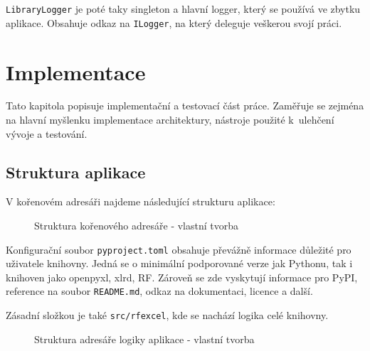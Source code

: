 \texttt{LibraryLogger} je poté taky singleton a hlavní logger, který se používá ve zbytku aplikace. Obsahuje odkaz na \texttt{ILogger}, na který deleguje veškerou svojí práci.

\chapter{Implementace}

Tato kapitola popisuje implementační a testovací část práce. Zaměřuje se zejména na hlavní myšlenku implementace architektury, nástroje použité k~ulehčení vývoje a testování.

\section{Struktura aplikace}

V kořenovém adresáři najdeme následující strukturu aplikace:

\begin{figure}[H]
    \captionsetup{name=Struktura}
    \vspace{1ex} 


    \caption{Struktura kořenového adresáře - vlastní tvorba}
    \label{fig:placeholder}
\end{figure}

Konfigurační soubor \texttt{pyproject.toml} obsahuje převážně informace důležité pro uživatele knihovny. Jedná se o minimální podporované verze jak Pythonu, tak i knihoven jako openpyxl, xlrd, RF. Zároveň se zde vyskytují informace pro PyPI, reference na soubor \texttt{README.md}, odkaz na dokumentaci, licence a další.

Zásadní složkou je také \texttt{src/rfexcel}, kde se nachází logika celé knihovny.

\begin{figure}[H]
    \captionsetup{name=Struktura}
    \vspace{1ex} 


    \caption{Struktura adresáře logiky aplikace - vlastní tvorba}
    \label{fig:placeholder}
\end{figure}

